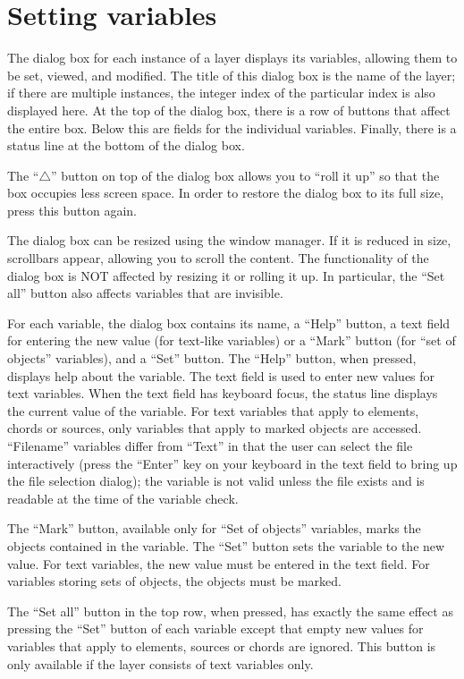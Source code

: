 \documentclass[12pt]{report}
\begin{document}
\section{Setting variables}

The dialog box for each instance of a layer displays its variables,
allowing them to be set, viewed, and modified.
The title of this dialog box is the name of the layer; if there are 
multiple instances, the integer index of the particular index
is also displayed here.  At the top of the dialog
box, there is a row of buttons that affect the entire box.
Below this are fields for the individual variables.  Finally, there
is a status line at the bottom of the dialog box.

The ``$\bigtriangleup$'' 
button on top of the dialog box allows you to ``roll it up''
so that the box occupies less screen space. In
order to restore the dialog box to its full size, press this button
again.

The dialog box can be resized using the window manager. If it is
reduced in size, scrollbars appear, allowing you to scroll the
content. The functionality of the dialog box is NOT affected by
resizing it or rolling it up. In particular, the ``Set all'' button also
affects variables that are invisible.

For each variable, the dialog box contains its name, a ``Help'' button, a
text field for entering the new value (for text-like variables) or a 
``Mark''
button (for ``set of objects'' variables), and a ``Set'' button.
The ``Help'' button, when pressed, displays help about the variable.
The text field is used to enter new values for text variables. When
the text field has keyboard focus, the status line displays the
current value of the variable. For text variables that apply to
elements, chords or sources, only variables that apply to marked
objects are accessed.  ``Filename'' variables differ from ``Text''
in that the user can select the file interactively (press the
``Enter'' key on your keyboard in the text field to bring up the
file selection dialog); the variable is not valid unless the file 
exists and is readable at the time of the variable check.

The ``Mark'' button, available only for ``Set of objects'' variables,
marks the objects contained in the variable.
The ``Set'' button sets the variable to the new value. For text
variables, the new value must be entered in the text
field. For variables storing sets of objects, the objects must be
marked.

The ``Set all'' button in the top row, when pressed, has exactly the
same effect as pressing the ``Set'' button of each variable except that
empty new values for variables that apply to elements, sources or
chords are ignored. This button is only available if the layer
consists of text variables only.
\end{document}
